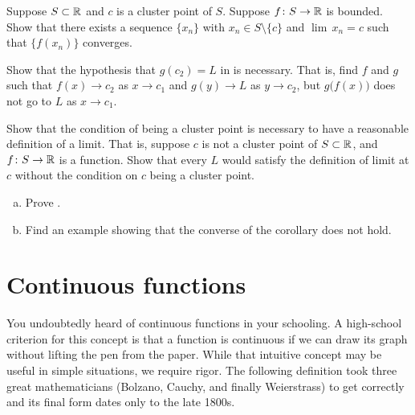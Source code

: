 \begin{exercise}
Suppose $S \subset {\mathbb{R}}$ and $c$ is a cluster point of $S$.  Suppose $f \colon
S \to {\mathbb{R}}$ is bounded.  Show that there exists a sequence $\{ x_n \}$
with $x_n \in S \setminus \{ c \}$ and $\lim\, x_n = c$ such that
$\{ f(x_n) \}$ converges.
\end{exercise}

\begin{exercise}[Challenging] \label{exercise:contlimitbadcomposition}
Show that the hypothesis that $g(c_2) = L$ in
 is necessary.  That is, find $f$
and $g$ such that $f(x) \to c_2$ as $x \to c_1$ and
$g(y) \to L$ as $y \to c_2$, but $g\bigl(f(x)\bigr)$ does not go to $L$
as $x \to c_1$.
\end{exercise}

\begin{exercise}
Show that the condition of being a cluster point is necessary to have a
reasonable definition of a limit.  That is, suppose $c$ is not a cluster
point of $S \subset {\mathbb{R}}$, and $f \colon S \to {\mathbb{R}}$ is a function.  Show that
every $L$ would satisfy the definition of limit at $c$ without the condition
on $c$ being a cluster point.
\end{exercise}

\begin{exercise}
\leavevmode
\begin{enumerate}[a)]
\item
Prove .
\item
Find an example showing that the converse of
the corollary does not hold.
\end{enumerate}
\end{exercise}


\sectionnewpage
\section{Continuous functions}
\label{sec:cont}


You undoubtedly heard of continuous functions in your schooling.  A
high-school criterion for this concept is that a function is continuous if
we can draw its graph without lifting the pen from the paper.  While that
intuitive concept may be useful in simple situations, we require
rigor.  The following definition took three great mathematicians
(Bolzano, Cauchy, and finally Weierstrass) to get correctly and its final
form dates only to the late 1800s.


